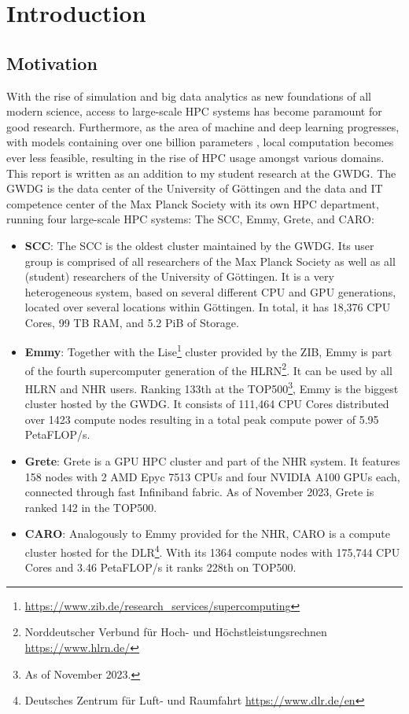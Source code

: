 \section{Introduction}
\subsection{Motivation}
With the rise of simulation and big data analytics as new foundations of all modern science,
access to large-scale \ac{HPC} systems has become paramount for good research. Furthermore,
as the area of machine and deep learning progresses, with models containing over one billion
parameters \cite{gpt4param},  local computation becomes ever less feasible, resulting in the 
rise of \ac{HPC} usage amongst various domains.\\

This report is written as an addition to my student research at the \ac{GWDG}. The \ac{GWDG} is the
data center of the University of Göttingen and the data and IT competence center of the 
Max Planck Society with its own \ac{HPC} department, running four large-scale \ac{HPC} systems:
The \ac{SCC}, Emmy, Grete, and CARO:
\begin{itemize}
\item \textbf{\ac{SCC}}\cite{SCC}: The \ac{SCC} is the oldest cluster maintained 
by the \ac{GWDG}. Its user group is comprised of all researchers of the Max Planck Society as 
well as all (student) researchers of the University of Göttingen. It is a very heterogeneous system,
based on several different CPU and GPU generations, located over several locations within 
Göttingen. In total, it has 18,376 CPU Cores, 99 TB RAM, and 5.2 PiB of Storage.
\item \textbf{Emmy}\cite{Emmy}: Together with the Lise\footnote{
\url{https://www.zib.de/research_services/supercomputing}} cluster provided by the ZIB, Emmy is 
part of  the fourth supercomputer generation of the HLRN\footnote{Norddeutscher Verbund für Hoch- 
und Höchstleistungsrechnen \url{https://www.hlrn.de/}}. It can be used by all HLRN and NHR users.
Ranking 133th at the TOP500\footnote{As of November 2023.}, Emmy is the biggest cluster hosted by
the \ac{GWDG}. It consists of 111,464 CPU Cores distributed over 1423 compute nodes resulting 
in a total peak compute power of 5.95 PetaFLOP/s.
\item \textbf{Grete}: Grete is a GPU \ac{HPC} cluster and part of the NHR system.
It features 158 nodes with 2 AMD Epyc 7513 CPUs and four NVIDIA A100 GPUs each, connected through fast
Infiniband fabric. As of November 2023, Grete is ranked 142 in the TOP500.
\item \textbf{CARO}\cite{CARO}: Analogously to Emmy provided for the NHR, CARO is a compute cluster
hosted for the DLR\footnote{Deutsches Zentrum für Luft- und Raumfahrt \url{https://www.dlr.de/en}}.
With its 1364 compute nodes with 175,744 CPU Cores and 3.46 PetaFLOP/s it ranks 228th on TOP500.
\end{itemize}

